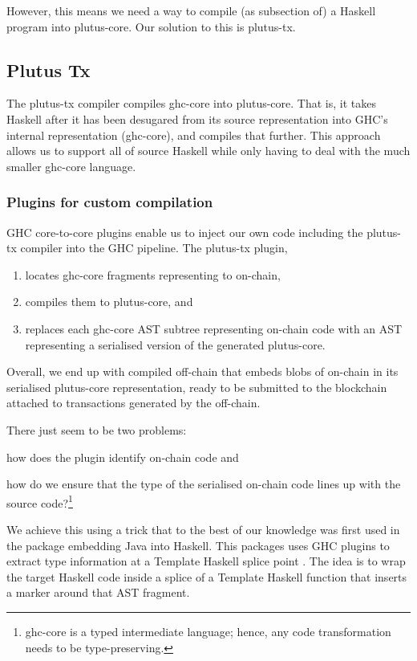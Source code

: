 However, this means we need a way to compile (as subsection of) a Haskell program into \gls{plutus-core}.
Our solution to this is \gls{plutus-tx}.

\subsection{Plutus Tx}
\label{sec:plutus-tx}

The \gls{plutus-tx} compiler compiles \gls{ghc-core} into \gls{plutus-core}.
That is, it takes Haskell after it has been desugared from its source representation into GHC's internal representation (\gls{ghc-core}), and compiles that further.
This approach allows us to support all of source Haskell while only having to deal with the much smaller \gls{ghc-core} language.

\subsubsection{Plugins for custom compilation}

GHC core-to-core plugins enable us to inject our own code including the \gls{plutus-tx} compiler into the GHC pipeline.
The \gls{plutus-tx} plugin,
\begin{enumerate}
\item locates \gls{ghc-core} fragments representing to \gls{on-chain},
\item compiles them to \gls{plutus-core}, and
\item replaces each \gls{ghc-core} AST subtree representing \gls{on-chain} code with an AST representing a serialised version of the generated \gls{plutus-core}.
\end{enumerate}

Overall, we end up with compiled \gls{off-chain} that embeds blobs of \gls{on-chain} in its serialised \gls{plutus-core} representation, ready to be submitted to the blockchain attached to transactions generated by the \gls{off-chain}.

There just seem to be two problems:
\begin{inparaenum}
\item how does the plugin identify on-chain code and
\item how do we ensure that the type of the serialised on-chain code lines up with the source code?\footnote{
\Gls{ghc-core} is a typed intermediate language; hence, any code transformation needs to be type-preserving.
}
\end{inparaenum}
We achieve this using a trick that to the best of our knowledge was first used in the  package embedding Java into Haskell.
This packages uses GHC plugins to extract type information at a Template Haskell splice point \autocite{inline-java-blog-post}.
The idea is to wrap the target Haskell code inside a splice of a Template Haskell function that inserts a marker around that AST fragment.

